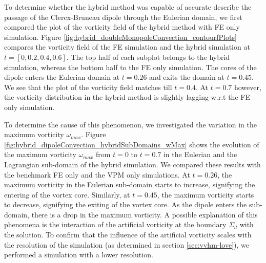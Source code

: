 To determine whether the hybrid method was capable of accurate describe the passage of the Clercx-Bruneau dipole through the Eulerian domain, we first compared the plot of the vorticity field of the hybrid method with FE only simulation. Figure \ref{fig:hybrid_doubleMonopoleConvection_contourfPlots} compares the vorticity field of the FE simulation and the hybrid simulation at $t=[0,0.2,0.4,0.6]$. The top half of each subplot belongs to the hybrid simulation, whereas the bottom half to the FE only simulation. The cores of the dipole enters the Eulerian domain at $t=0.26$ and exits the domain at $t=0.45$. We see that the plot of the vorticity field matches till $t=0.4$. At $t=0.7$ however, the vorticity distribution in the hybrid method is slightly lagging w.r.t the FE only simulation. 

To determine the cause of this phenomenon, we investigated the variation in the maximum vorticity $\omega_{max}$. Figure \ref{fig:hybrid_dipoleConvection_hybridSubDomains_wMax} shows the evolution of the maximum vorticity $\omega_{max}$ from $t=0$ to $t=0.7$ in the Eulerian and the Lagrangian sub-domain of the hybrid simulation. We compared these results with the benchmark FE only and the VPM only simulations. At $t=0.26$, the maximum vorticity in the Eulerian sub-domain starts to increase, signifying the entering of the vortex core. Similarly, at $t=0.45$, the maximum vorticity starts to decrease, signifying the exiting of the vortex core. As the dipole enters the sub-domain, there is a drop in the maximum vorticity. A possible explanation of this phenomena is the interaction of the artificial vorticity at the boundary $\Sigma_d$ with the solution. To confirm that the influence of the artificial vorticity scales with the resolution of the simulation (as determined in section \ref{sec:vvhm-love}), we performed a simulation with a lower resolution.

	
